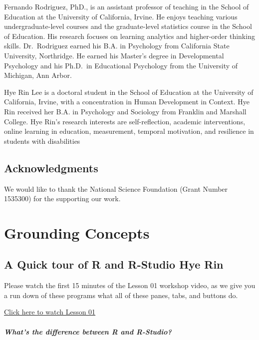 \documentclass[
]{book}
\begin{document}
Fernando Rodriguez, PhD., is an assistant professor of teaching in the School of Education at the University of California, Irvine. He enjoys teaching various undergraduate-level courses and the graduate-level statistics course in the School of Education. His research focuses on learning analytics and higher-order thinking skills. Dr.~Rodriguez earned his B.A. in Psychology from California State University, Northridge. He earned his Master's degree in Developmental Psychology and his Ph.D.~in Educational Psychology from the University of Michigan, Ann Arbor.

Hye Rin Lee is a doctoral student in the School of Education at the University of California, Irvine, with a concentration in Human Development in Context. Hye Rin received her B.A. in Psychology and Sociology from Franklin and Marshall College. Hye Rin's research interests are self-reflection, academic interventions, online learning in education, measurement, temporal motivation, and resilience in students with disabilities

\hypertarget{acknowledgments}{%
\section{Acknowledgments}\label{acknowledgments}}

We would like to thank the National Science Foundation (Grant Number 1535300) for the supporting our work.

\hypertarget{grounding-concepts}{%
\chapter{Grounding Concepts}\label{grounding-concepts}}

\hypertarget{a-quick-tour-of-r-and-r-studio-hye-rin}{%
\section{A Quick tour of R and R-Studio Hye Rin}\label{a-quick-tour-of-r-and-r-studio-hye-rin}}

Please watch the first 15 minutes of the Lesson 01 workshop video, as we give you a run down of these programs what all of these panes, tabs, and buttons do.

\href{https://drive.google.com/file/d/1EYdeTYf1h-wI759Ci6w2ckWNjc194LT3/view?usp=sharing}{Click here to watch Lesson 01}

\hypertarget{whats-the-difference-between-r-and-r-studio}{%
\subsubsection{\texorpdfstring{\emph{What's the difference between R and R-Studio?}}{What's the difference between R and R-Studio?}}\label{whats-the-difference-between-r-and-r-studio}}
\end{document}
